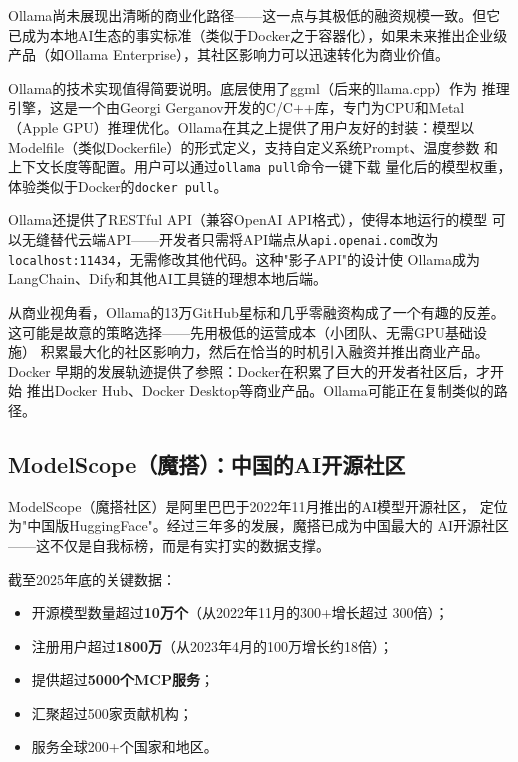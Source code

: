 Ollama尚未展现出清晰的商业化路径——这一点与其极低的融资规模一致。但它
已成为本地AI生态的事实标准（类似于Docker之于容器化），如果未来推出企业级
产品（如Ollama Enterprise），其社区影响力可以迅速转化为商业价值。

Ollama的技术实现值得简要说明。底层使用了ggml（后来的llama.cpp）作为
推理引擎，这是一个由Georgi Gerganov开发的C/C++库，专门为CPU和Metal
（Apple GPU）推理优化。Ollama在其之上提供了用户友好的封装：模型以
Modelfile（类似Dockerfile）的形式定义，支持自定义系统Prompt、温度参数
和上下文长度等配置。用户可以通过\texttt{ollama pull}命令一键下载
量化后的模型权重，体验类似于Docker的\texttt{docker pull}。

Ollama还提供了RESTful API（兼容OpenAI API格式），使得本地运行的模型
可以无缝替代云端API——开发者只需将API端点从\texttt{api.openai.com}改为
\texttt{localhost:11434}，无需修改其他代码。这种"影子API"的设计使
Ollama成为LangChain、Dify和其他AI工具链的理想本地后端。

从商业视角看，Ollama的13万GitHub星标和几乎零融资构成了一个有趣的反差。
这可能是故意的策略选择——先用极低的运营成本（小团队、无需GPU基础设施）
积累最大化的社区影响力，然后在恰当的时机引入融资并推出商业产品。Docker
早期的发展轨迹提供了参照：Docker在积累了巨大的开发者社区后，才开始
推出Docker Hub、Docker Desktop等商业产品。Ollama可能正在复制类似的路径。

\subsection{ModelScope（魔搭）：中国的AI开源社区}
\label{subsec:modelscope}

ModelScope（魔搭社区）是阿里巴巴于2022年11月推出的AI模型开源社区，
定位为"中国版HuggingFace"。经过三年多的发展，魔搭已成为中国最大的
AI开源社区——这不仅是自我标榜，而是有实打实的数据支撑。

截至2025年底的关键数据：
\begin{itemize}
  \item 开源模型数量超过\textbf{10万个}（从2022年11月的300+增长超过
    300倍）；
  \item 注册用户超过\textbf{1800万}（从2023年4月的100万增长约18倍）；
  \item 提供超过\textbf{5000个MCP服务}；
  \item 汇聚超过500家贡献机构；
  \item 服务全球200+个国家和地区。
\end{itemize}

